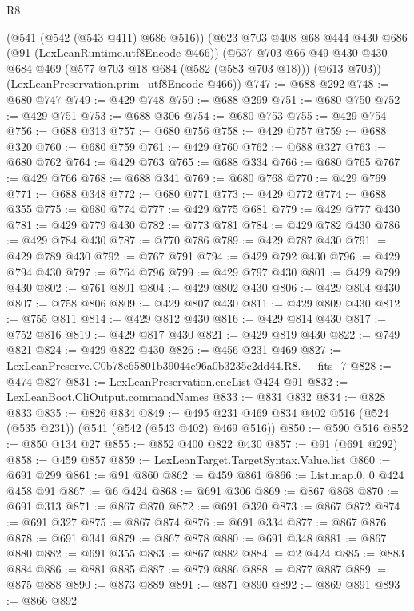 \begin{lexlean}{R8}
\begin{coremodule}
    (@541 (@542 (@543 @411) @686 @516))
    (@623
      @703
      @408
      @68
      @444
      @430
      @686
      (@91 (LexLeanRuntime.utf8Encode @466))
      (@637
        @703
        @66
        @49
        @430
        @430
        @684
        @469
        (@577 @703 @18 @684 (@582 (@583 @703 @18)))
        (@613 @703))
      (LexLeanPreservation.prim_utf8Encode @466))
@747 := @688 @292
@748 := @680 @747
@749 := @429 @748
@750 := @688 @299
@751 := @680 @750
@752 := @429 @751
@753 := @688 @306
@754 := @680 @753
@755 := @429 @754
@756 := @688 @313
@757 := @680 @756
@758 := @429 @757
@759 := @688 @320
@760 := @680 @759
@761 := @429 @760
@762 := @688 @327
@763 := @680 @762
@764 := @429 @763
@765 := @688 @334
@766 := @680 @765
@767 := @429 @766
@768 := @688 @341
@769 := @680 @768
@770 := @429 @769
@771 := @688 @348
@772 := @680 @771
@773 := @429 @772
@774 := @688 @355
@775 := @680 @774
@777 := @429 @775 @681
@779 := @429 @777 @430
@781 := @429 @779 @430
@782 := @773 @781
@784 := @429 @782 @430
@786 := @429 @784 @430
@787 := @770 @786
@789 := @429 @787 @430
@791 := @429 @789 @430
@792 := @767 @791
@794 := @429 @792 @430
@796 := @429 @794 @430
@797 := @764 @796
@799 := @429 @797 @430
@801 := @429 @799 @430
@802 := @761 @801
@804 := @429 @802 @430
@806 := @429 @804 @430
@807 := @758 @806
@809 := @429 @807 @430
@811 := @429 @809 @430
@812 := @755 @811
@814 := @429 @812 @430
@816 := @429 @814 @430
@817 := @752 @816
@819 := @429 @817 @430
@821 := @429 @819 @430
@822 := @749 @821
@824 := @429 @822 @430
@826 := @456 @231 @469
@827 := LexLeanPreserve.C0b78c65801b39044e96a0b3235c2dd44.R8.__fits_7
@828 := @474 @827
@831 := LexLeanPreservation.encList @424 @91
@832 := LexLeanBoot.CliOutput.commandNames
@833 := @831 @832
@834 := @828 @833
@835 := @826 @834
@849 := @495 @231 @469 @834 @402 @516 (@524 (@535 @231)) (@541 (@542 (@543 @402) @469 @516))
@850 := @590 @516
@852 := @850 @134 @27
@855 := @852 @400 @822 @430
@857 := @91 (@691 @292)
@858 := @459 @857
@859 := LexLeanTarget.TargetSyntax.Value.list
@860 := @691 @299
@861 := @91 @860
@862 := @459 @861
@866 := List.map.{0, 0} @424 @458 @91
@867 := @6 @424
@868 := @691 @306
@869 := @867 @868
@870 := @691 @313
@871 := @867 @870
@872 := @691 @320
@873 := @867 @872
@874 := @691 @327
@875 := @867 @874
@876 := @691 @334
@877 := @867 @876
@878 := @691 @341
@879 := @867 @878
@880 := @691 @348
@881 := @867 @880
@882 := @691 @355
@883 := @867 @882
@884 := @2 @424
@885 := @883 @884
@886 := @881 @885
@887 := @879 @886
@888 := @877 @887
@889 := @875 @888
@890 := @873 @889
@891 := @871 @890
@892 := @869 @891
@893 := @866 @892

\end{coremodule}
\end{lexlean}
